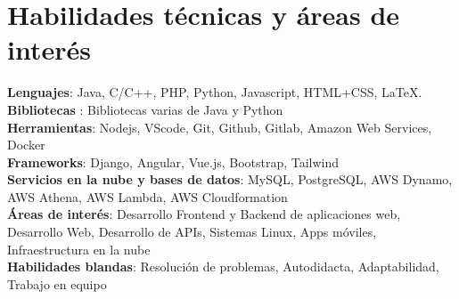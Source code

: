 \documentclass[a4paper,11pt]{article}
\makeatletter
\newcommand{\resumePOR}[3]{
\vspace{0.5mm}\item
    \begin{tabular*}{0.97\textwidth}[t]{l@{\extracolsep{\fill}}r}
        \textbf{#1}\hspace{0.3mm}#2 & \textit{\small{#3}} 
    \end{tabular*}
    \vspace{-2mm}
}
\newcommand{\resumeSubHeadingListStart}{\begin{itemize}[leftmargin=*,labelsep=0mm]}
\newcommand{\resumeItemListStart}{\begin{justify}\begin{itemize}[leftmargin=3ex, rightmargin=2ex, noitemsep,labelsep=1.2mm,itemsep=0mm]\small}
\newcommand{\resumeSubHeadingListEnd}{\end{itemize}\vspace{2mm}}
\newcommand{\resumeItemListEnd}{\end{itemize}\end{justify}\vspace{-2mm}}
\makeatother
\begin{document}
\section{\textbf{Habilidades técnicas y áreas de interés}}
 \begin{itemize}[leftmargin=0.05in, label={}]
    \small{\item{
     \textbf{Lenguajes}{: Java, C/C++, PHP, Python, Javascript, HTML+CSS, LaTeX. } \\
     \textbf{Bibliotecas }{: Bibliotecas varias de Java y Python }\\ 
     \textbf{Herramientas}{: Nodejs, VScode, Git, Github, Gitlab, Amazon Web Services, Docker } \\ 
     \textbf{Frameworks}{: Django, Angular, Vue.js, Bootstrap, Tailwind } \\
     \textbf{Servicios en la nube y bases de datos}{: MySQL, PostgreSQL, AWS Dynamo, AWS Athena, AWS Lambda, AWS Cloudformation } \\   
     \textbf{Áreas de interés}{: Desarrollo Frontend y Backend de aplicaciones web, Desarrollo Web, Desarrollo de APIs, Sistemas Linux, Apps móviles, Infraestructura en la nube } \\
     \textbf{Habilidades blandas}{: Resolución de problemas, Autodidacta, Adaptabilidad, Trabajo en equipo} \\
    }}
 \end{itemize}
 \vspace{-16pt}



\begin{comment}
\section{\textbf{Positions of Responsibility}}
\vspace{-0.4mm}
\resumeSubHeadingListStart
\resumePOR{On Desk Registrations Volunteer } %
    {Aarhant Cyber Week Event - RCOEM, Nagpur} %
    {Oct - Dec 2022} %
    \resumeItemListStart
    \item {Helped to attract close to 300 attendees to the event.}
    \item {Collected over Rs. 20,000 in entry fees for different activities.}
    \resumeItemListEnd

\resumeSubHeadingListEnd
\vspace{-5mm}
\end{comment}
\end{document}
